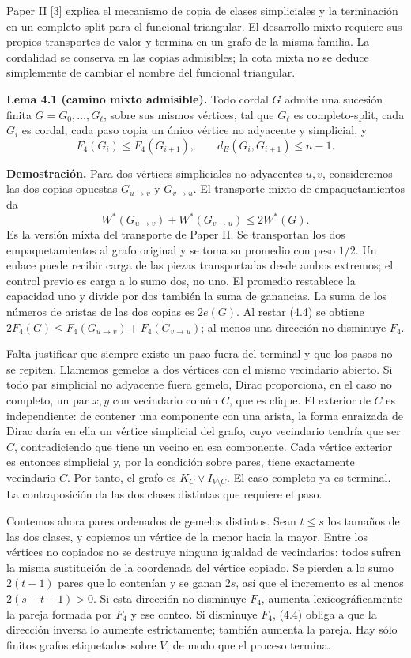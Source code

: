 \documentclass[spanish,11pt,a4paper]{article}
\begin{document}
Paper II {[}3{]} explica el mecanismo de copia de clases simpliciales y la terminación en un completo-split para el funcional triangular. El desarrollo mixto requiere sus propios transportes de valor y termina en un grafo de la misma familia. La cordalidad se conserva en las copias admisibles; la cota mixta no se deduce simplemente de cambiar el nombre del funcional triangular.


\textbf{Lema 4.1 (camino mixto admisible).} Todo cordal \(G\) admite una sucesión finita \(G=G_0,\ldots,G_\ell\), sobre sus mismos vértices, tal que \(G_\ell\) es completo-split, cada \(G_i\) es cordal, cada paso copia un único vértice no adyacente y simplicial, y \[
F_4(G_i)\le F_4(G_{i+1}),\qquad
d_E(G_i,G_{i+1})\le n-1.
\tag{4.3}
\]

\textbf{Demostración.} Para dos vértices simpliciales no adyacentes \(u,v\), consideremos las dos copias opuestas \(G_{u\to v}\) y \(G_{v\to u}\). El transporte mixto de empaquetamientos da \[
W^*(G_{u\to v})+W^*(G_{v\to u})\le2W^*(G).
\tag{4.4}
\] Es la versión mixta del transporte de Paper II. Se transportan los dos empaquetamientos al grafo original y se toma su promedio con peso \(1/2\). Un enlace puede recibir carga de las piezas transportadas desde ambos extremos; el control previo es carga a lo sumo dos, no uno. El promedio restablece la capacidad uno y divide por dos también la suma de ganancias. La suma de los números de aristas de las dos copias es \(2e(G)\). Al restar (4.4) se obtiene \(2F_4(G)\le F_4(G_{u\to v})+F_4(G_{v\to u})\); al menos una dirección no disminuye \(F_4\).

Falta justificar que siempre existe un paso fuera del terminal y que los pasos no se repiten. Llamemos gemelos a dos vértices con el mismo vecindario abierto. Si todo par simplicial no adyacente fuera gemelo, Dirac proporciona, en el caso no completo, un par \(x,y\) con vecindario común \(C\), que es clique. El exterior de \(C\) es independiente: de contener una componente con una arista, la forma enraizada de Dirac daría en ella un vértice simplicial del grafo, cuyo vecindario tendría que ser \(C\), contradiciendo que tiene un vecino en esa componente. Cada vértice exterior es entonces simplicial y, por la condición sobre pares, tiene exactamente vecindario \(C\). Por tanto, el grafo es \(K_C\vee I_{V\setminus C}\). El caso completo ya es terminal. La contraposición da las dos clases distintas que requiere el paso.

Contemos ahora pares ordenados de gemelos distintos. Sean \(t\le s\) los tamaños de las dos clases, y copiemos un vértice de la menor hacia la mayor. Entre los vértices no copiados no se destruye ninguna igualdad de vecindarios: todos sufren la misma sustitución de la coordenada del vértice copiado. Se pierden a lo sumo \(2(t-1)\) pares que lo contenían y se ganan \(2s\), así que el incremento es al menos \(2(s-t+1)>0\). Si esta dirección no disminuye \(F_4\), aumenta lexicográficamente la pareja formada por \(F_4\) y ese conteo. Si disminuye \(F_4\), (4.4) obliga a que la dirección inversa lo aumente estrictamente; también aumenta la pareja. Hay sólo finitos grafos etiquetados sobre \(V\), de modo que el proceso termina.
\end{document}
